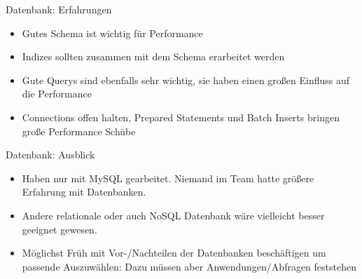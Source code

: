 \begin{frame}{Datenbank: Erfahrungen}
	\begin{itemize}
		\item Gutes Schema ist wichtig für Performance
		\item Indizes sollten zusammen mit dem Schema erarbeitet werden
		\item Gute Querys sind ebenfalls sehr wichtig, sie haben einen großen Einfluss auf die Performance
		\item Connections offen halten, Prepared Statements und Batch Inserts bringen große Performance Schübe
	\end{itemize}
\end{frame}

\begin{frame}{Datenbank: Ausblick}
	\begin{itemize}
	\item Haben nur mit MySQL gearbeitet. Niemand im Team hatte größere Erfahrung mit Datenbanken.
	\item Andere relationale oder auch NoSQL Datenbank wäre vielleicht besser geeignet gewesen.
	\item Möglichst Früh mit Vor-/Nachteilen der Datenbanken beschäftigen um passende Auszuwählen: Dazu müssen aber Anwendungen/Abfragen feststehen
	\end{itemize}
\end{frame}


